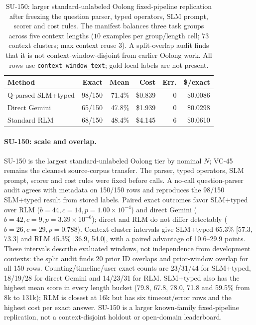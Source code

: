 \documentclass[letterpaper]{article}
\begin{document}
\begin{table}[!t]
\centering
\small
\setlength{\tabcolsep}{3pt}
\begin{tabular}{@{}lrrrrr@{}}
\toprule
\textbf{Method} & \textbf{Exact} & \textbf{Mean} & \textbf{Cost} & \textbf{Err.} & \textbf{\$/exact} \\
\midrule
Q-parsed SLM+typed & 98/150 & 71.4\% & \$0.839 & 0 & \$0.0086 \\
Direct Gemini & 65/150 & 47.8\% & \$1.939 & 0 & \$0.0298 \\
Standard RLM & 68/150 & 48.4\% & \$4.145 & 6 & \$0.0610 \\
\bottomrule
\end{tabular}
\caption{SU-150: larger standard-unlabeled Oolong fixed-pipeline replication after freezing the question parser, typed operators, SLM prompt, scorer and cost rules. The manifest balances three task groups across five context lengths ($10$ examples per group/length cell; 73 context clusters; max context reuse 3). A split-overlap audit finds that it is not context-window-disjoint from earlier Oolong work. All rows use \texttt{context\_window\_text}; gold local labels are not present.}
\label{tab:supp-oolong-validation-n150}
\end{table}

\paragraph{SU-150: scale and overlap.}
SU-150 is the largest standard-unlabeled Oolong tier by nominal $N$; VC-45 remains the cleanest source-corpus transfer. The parser, typed operators, SLM prompt, scorer and cost rules were fixed before calls. A no-call question-parser audit agrees with metadata on 150/150 rows and reproduces the 98/150 SLM+typed result from stored labels. Paired exact outcomes favor SLM+typed over RLM ($b=44,c=14,p=1.00\times10^{-4}$) and direct Gemini ($b=42,c=9,p=3.39\times10^{-6}$); direct and RLM do not differ detectably ($b=26,c=29,p=0.788$). Context-cluster intervals give SLM+typed 65.3\% [57.3, 73.3] and RLM 45.3\% [36.9, 54.0], with a paired advantage of 10.6--29.9 points. These intervals describe evaluated windows, not independence from development contexts: the split audit finds 20 prior ID overlaps and prior-window overlap for all 150 rows. Counting/timeline/user exact counts are 23/31/44 for SLM+typed, 18/19/28 for direct Gemini and 14/23/31 for RLM. SLM+typed also has the highest mean score in every length bucket (79.8, 67.8, 78.0, 71.8 and 59.5\% from 8k to 131k); RLM is closest at 16k but has six timeout/error rows and the highest cost per exact answer. SU-150 is a larger known-family fixed-pipeline replication, not a context-disjoint holdout or open-domain leaderboard.
\end{document}
